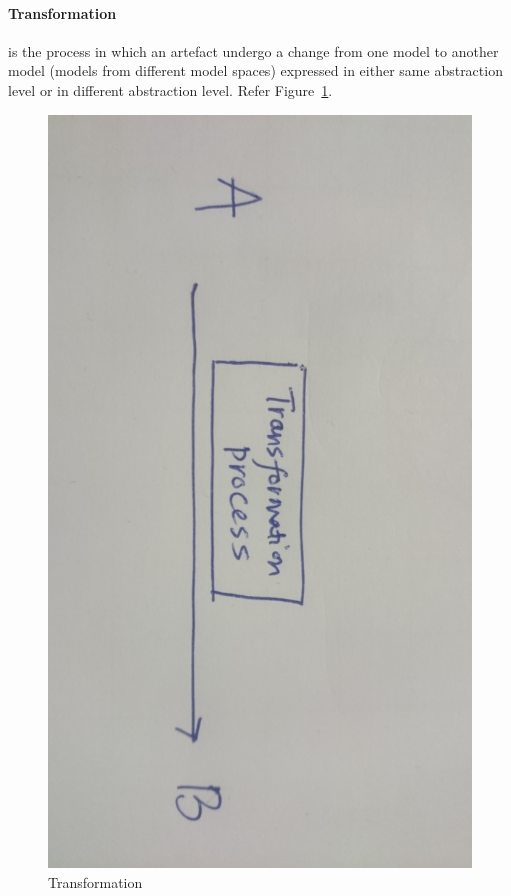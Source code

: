 \paragraph{Transformation} is the process in which an artefact undergo a change from one model to another model (models from different model spaces) expressed in either same abstraction level or in different abstraction level. Refer Figure~\ref{fig:Transformation}.
\begin{figure}
	\includegraphics[width=1\textwidth]{figures/Transformation}
	\caption{Transformation}
	\label{fig:Transformation}
\end{figure}
